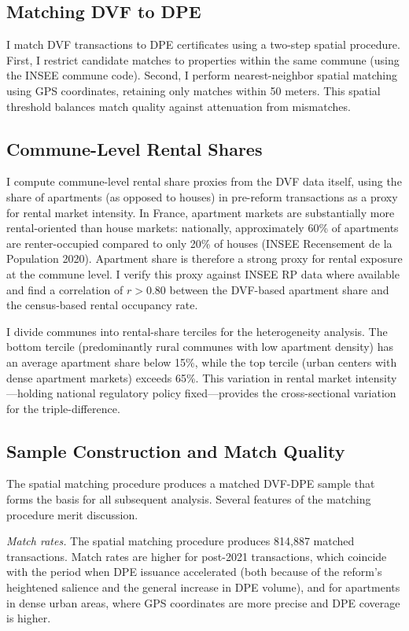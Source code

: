 \documentclass[12pt]{article}
\begin{document}
\subsection{Matching DVF to DPE}

I match DVF transactions to DPE certificates using a two-step spatial procedure. First, I restrict candidate matches to properties within the same commune (using the INSEE commune code). Second, I perform nearest-neighbor spatial matching using GPS coordinates, retaining only matches within 50 meters. This spatial threshold balances match quality against attenuation from mismatches.

\subsection{Commune-Level Rental Shares}

I compute commune-level rental share proxies from the DVF data itself, using the share of apartments (as opposed to houses) in pre-reform transactions as a proxy for rental market intensity. In France, apartment markets are substantially more rental-oriented than house markets: nationally, approximately 60\% of apartments are renter-occupied compared to only 20\% of houses (INSEE Recensement de la Population 2020). Apartment share is therefore a strong proxy for rental exposure at the commune level. I verify this proxy against INSEE RP data where available and find a correlation of $r > 0.80$ between the DVF-based apartment share and the census-based rental occupancy rate.

I divide communes into rental-share terciles for the heterogeneity analysis. The bottom tercile (predominantly rural communes with low apartment density) has an average apartment share below 15\%, while the top tercile (urban centers with dense apartment markets) exceeds 65\%. This variation in rental market intensity---holding national regulatory policy fixed---provides the cross-sectional variation for the triple-difference.

\subsection{Sample Construction and Match Quality}

The spatial matching procedure produces a matched DVF-DPE sample that forms the basis for all subsequent analysis. Several features of the matching procedure merit discussion.

\textit{Match rates.} The spatial matching procedure produces 814,887 matched transactions. Match rates are higher for post-2021 transactions, which coincide with the period when DPE issuance accelerated (both because of the reform's heightened salience and the general increase in DPE volume), and for apartments in dense urban areas, where GPS coordinates are more precise and DPE coverage is higher.
\end{document}
